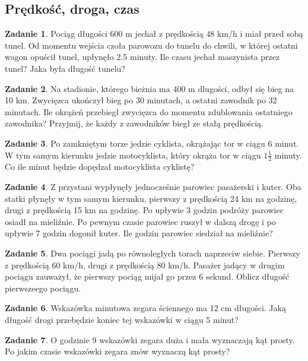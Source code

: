 \documentclass[11pt]{article}
\theoremstyle{definition}
\newtheorem{zad}{Zadanie}
\numberwithin{zad}{section}
\begin{document}
\subsection{Prędkość, droga, czas}

\begin{zad}
Pociąg długości $600$ m jechał z prędkością $48$ km/h i miał przed sobą tunel. Od momentu wejścia czoła parowozu do tunelu do chwili, w której ostatni wagon opuścił tunel, upłynęło 2.5 minuty. Ile czasu jechał maszynista przez tunel? Jaka była długość tunelu?
\end{zad}

\begin{zad}
Na stadionie, którego bieżnia ma 400 m dlugości, odbył się bieg na 10 km. Zwycięzca ukończył bieg po 30 minutach, a ostatni zawodnik po 32 minutach. Ile okrążeń przebiegł zwycięzca do momentu zdublowania ostatniego zawodnika? Przyjmij, że każdy z zawodników biegł ze stałą prędkością.
\end{zad}

\begin{zad}
Po zamkniętym torze jedzie cyklista, okrążając tor w ciągu 6 minut. W tym samym kierunku jedzie motocyklista, który okrąża tor w ciągu $1\frac12$ minuty. Co ile minut będzie dopędzał motocyklista cyklistę?
\end{zad}

\begin{zad}
Z przystani wypłynęły jednocześnie parowiec pasażerski i kuter. Oba statki płynęły w tym samym kierunku, pierwszy z prędkością 24 km na godzinę, drugi z prędkością 15 km na godzinę. Po upływie 3 godzin podróży parowiec osiadł na mieliźnie. Po pewnym czasie parowiec ruszył w dalszą drogę i po upływie 7 godzin dogonił kuter. Ile godzin parowiec siedział na mieliźnie?
\end{zad}

\begin{zad}
Dwa pociągi jadą po równoległych torach naprzeciw siebie. Pierwszy z prędkością 60 km/h, drugi z prędkością 80 km/h. Pasażer jadący w drugim pociągu zauważył, że pierwszy pociąg mijał go przez 6 sekund. Oblicz długość pierwszeego pociągu.
\end{zad}

\begin{zad}
Wskazówka minutowa zegara ściennego ma 12 cm długości. Jaką długość drogi przebędzie koniec tej wskazówki w ciągu 5 minut?
\end{zad}

\begin{zad}
O godzinie 9 wskazówki zegara duża i mała wyznaczają kąt prosty. Po jakim czasie wskazówki zegara znów wyznaczą kąt prosty?
\end{zad}
\end{document}
